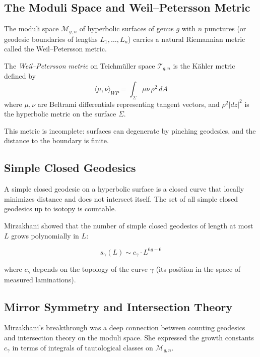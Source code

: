 \subsection{The Moduli Space and Weil--Petersson Metric}

The moduli space $\mathcal{M}_{g,n}$ of hyperbolic surfaces of genus $g$ with $n$ punctures (or geodesic boundaries of lengths $L_1, \ldots, L_n$) carries a natural Riemannian metric called the Weil--Petersson metric.

\begin{definition}
The \emph{Weil--Petersson metric} on Teichm\"uller space $\mathcal{T}_{g,n}$ is the K\"ahler metric defined by
\[\langle \mu, \nu \rangle_{WP} = \int_{\Sigma} \mu \overline{\nu} \, \rho^2 \, dA\]
where $\mu, \nu$ are Beltrami differentials representing tangent vectors, and $\rho^2|dz|^2$ is the hyperbolic metric on the surface $\Sigma$.
\end{definition}

This metric is incomplete: surfaces can degenerate by pinching geodesics, and the distance to the boundary is finite.

\subsection{Simple Closed Geodesics}

A simple closed geodesic on a hyperbolic surface is a closed curve that locally minimizes distance and does not intersect itself. The set of all simple closed geodesics up to isotopy is countable.

Mirzakhani showed that the number of simple closed geodesics of length at most $L$ grows polynomially in $L$:

\begin{equation}
s_\gamma(L) \sim c_\gamma \cdot L^{6g-6}
\end{equation}

where $c_\gamma$ depends on the topology of the curve $\gamma$ (its position in the space of measured laminations).

\subsection{Mirror Symmetry and Intersection Theory}

Mirzakhani's breakthrough was a deep connection between counting geodesics and intersection theory on the moduli space. She expressed the growth constants $c_\gamma$ in terms of integrals of tautological classes on $\mathcal{M}_{g,n}$.

